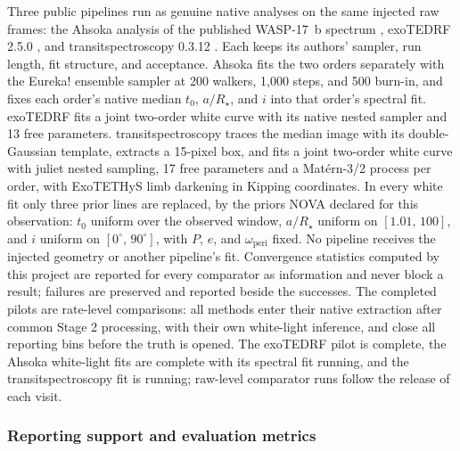Three public pipelines run as genuine native analyses on the same
injected raw frames: the Ahsoka analysis of the published WASP-17~b
spectrum \citep{LouieEtAl2025}, exoTEDRF 2.5.0 \citep{Radica2024}, and
transitspectroscopy 0.3.12 \citep{Espinoza2022TransitSpectroscopy}. Each
keeps its authors' sampler, run length, fit structure, and acceptance.
Ahsoka fits the two orders separately with the Eureka! ensemble sampler
at 200 walkers, 1{,}000 steps, and 500 burn-in, and fixes each order's
native median $t_0$, $a/R_\star$, and $i$ into that order's spectral
fit. exoTEDRF fits a joint two-order white curve with its native nested
sampler and 13 free parameters. transitspectroscopy traces the median
image with its double-Gaussian template, extracts a 15-pixel box, and
fits a joint two-order white curve with juliet nested sampling, 17 free
parameters and a Mat\'ern-3/2 process per order, with ExoTETHyS limb
darkening in Kipping coordinates. In every white fit only three
prior lines are replaced, by the priors NOVA declared for this
observation: $t_0$ uniform over the observed window, $a/R_\star$ uniform
on $[1.01,\,100]$, and $i$ uniform on $[0^\circ,\,90^\circ]$, with $P$,
$e$, and $\omega_{\mathrm{peri}}$ fixed. No pipeline receives the
injected geometry or another pipeline's fit. Convergence statistics
computed by this project are reported for every comparator as
information and never block a result; failures are preserved and
reported beside the successes. The completed pilots are rate-level
comparisons: all methods enter their native extraction after common
Stage 2 processing, with their own white-light inference, and close all
reporting bins before the truth is opened. The exoTEDRF pilot is
complete, the Ahsoka white-light fits are complete with its spectral fit
running, and the transitspectroscopy fit is running; raw-level
comparator runs follow the release of each visit.

\subsubsection{Reporting support and evaluation metrics}


